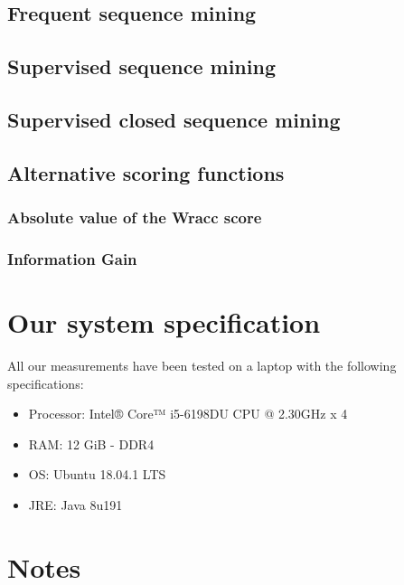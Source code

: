 \documentclass[11pt, a4paper]{article}
\begin{document}
		\subsection{Frequent sequence mining}
		\subsection{Supervised sequence mining}
		\subsection{Supervised closed sequence mining}
		\subsection{Alternative scoring functions}
			\subsubsection{Absolute value of the Wracc score}
			\subsubsection{Information Gain}			
	\section{Our system specification}
		All our measurements have been tested on a laptop with the following specifications:
		\begin{multicols}{2}
			\begin{itemize}
				\item Processor: Intel® Core™ i5-6198DU CPU @ 2.30GHz x 4 
				\item RAM: 12 GiB - DDR4
				\item OS: Ubuntu 18.04.1 LTS
				\item JRE: Java 8u191
			\end{itemize}
		\end{multicols}
	
	\section{Notes}
		
\end{document}
